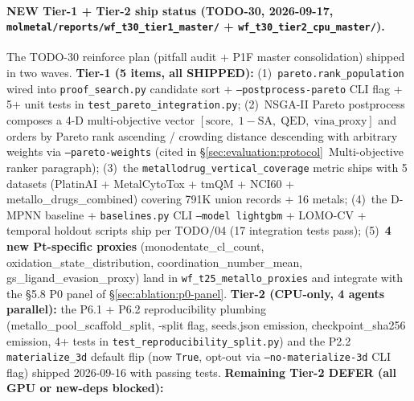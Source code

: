 \paragraph{NEW Tier-1 + Tier-2 ship status (TODO-30, 2026-09-17,
\texttt{molmetal/reports/wf\_t30\_tier1\_master/} + \texttt{wf\_t30\_tier2\_cpu\_master/}).}
The TODO-30 reinforce plan (pitfall audit + P1F master consolidation)
shipped in two waves. \textbf{Tier-1 (5 items, all SHIPPED):}
(1)~\texttt{pareto.rank\_population} wired into
\texttt{proof\_search.py} candidate sort + \texttt{--postprocess-pareto}
CLI flag + 5+ unit tests in \texttt{test\_pareto\_integration.py};
(2)~NSGA-II Pareto postprocess composes a 4-D multi-objective vector
$[\mathrm{score},\; 1-\mathrm{SA},\; \mathrm{QED},\; \mathrm{vina\_proxy}]$
and orders by Pareto rank ascending / crowding distance descending
with arbitrary weights via \texttt{--pareto-weights} (cited in
\S\ref{sec:evaluation:protocol}~Multi-objective ranker paragraph);
(3)~the \texttt{metallodrug\_vertical\_coverage} metric ships with
5 datasets (PlatinAI + MetalCytoTox + tmQM + NCI60 + metallo\_drugs\_combined)
covering 791K union records + 16 metals;
(4)~the D-MPNN baseline + \texttt{baselines.py} CLI \texttt{--model lightgbm}
+ LOMO-CV + temporal holdout scripts ship per TODO/04 (17 integration tests pass);
(5)~\textbf{4 new Pt-specific proxies} (monodentate\_cl\_count,
oxidation\_state\_distribution, coordination\_number\_mean,
gs\_ligand\_evasion\_proxy) land in \texttt{wf\_t25\_metallo\_proxies}
and integrate with the §5.8 P0 panel of
\S\ref{sec:ablation:p0-panel}.
\textbf{Tier-2 (CPU-only, 4 agents parallel):} the
P6.1 + P6.2 reproducibility plumbing (metallo\_pool\_scaffold\_split,
\--split flag, seeds.json emission, checkpoint\_sha256 emission,
4+ tests in \texttt{test\_reproducibility\_split.py}) and the
P2.2 \texttt{materialize\_3d} default flip (now \texttt{True},
opt-out via \texttt{--no-materialize-3d} CLI flag) shipped
2026-09-16 with passing tests.
\textbf{Remaining Tier-2 DEFER (all GPU or new-deps blocked):}
